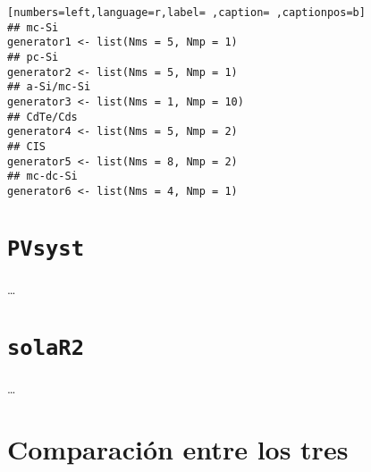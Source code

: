 \begin{lstlisting}[numbers=left,language=r,label= ,caption= ,captionpos=b]
## mc-Si
generator1 <- list(Nms = 5, Nmp = 1)
## pc-Si
generator2 <- list(Nms = 5, Nmp = 1)
## a-Si/mc-Si
generator3 <- list(Nms = 1, Nmp = 10)
## CdTe/Cds
generator4 <- list(Nms = 5, Nmp = 2)
## CIS
generator5 <- list(Nms = 8, Nmp = 2)
## mc-dc-Si
generator6 <- list(Nms = 4, Nmp = 1)
\end{lstlisting}

\section{\texttt{PVsyst}}
\label{sec:org85a1444}

\ldots{}


\section{\texttt{solaR2}}
\label{sec:org86393b1}

\ldots{}

\section{Comparación entre los tres}
\label{sec:orgb85f81f}
